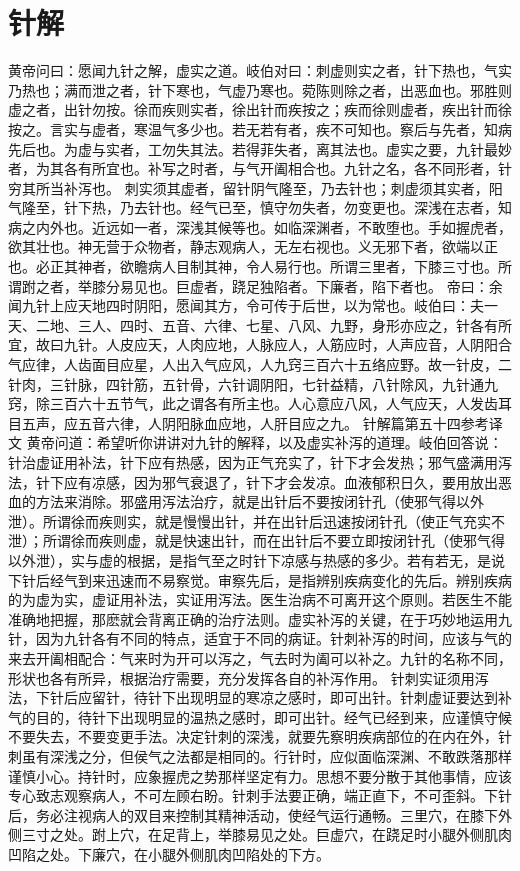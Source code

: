 \documentclass[a4paper,12pt,UTF8,twoside]{ctexbook}
\begin{document}
\chapter{针解}
黄帝问曰：愿闻九针之解，虚实之道。岐伯对曰：刺虚则实之者，针下热也，气实乃热也；满而泄之者，针下寒也，气虚乃寒也。菀陈则除之者，出恶血也。邪胜则虚之者，出针勿按。徐而疾则实者，徐出针而疾按之；疾而徐则虚者，疾出针而徐按之。言实与虚者，寒温气多少也。若无若有者，疾不可知也。察后与先者，知病先后也。为虚与实者，工勿失其法。若得菲失者，离其法也。虚实之要，九针最妙者，为其各有所宜也。补写之时者，与气开阖相合也。九针之名，各不同形者，针穷其所当补泻也。
刺实须其虚者，留针阴气隆至，乃去针也；刺虚须其实者，阳气隆至，针下热，乃去针也。经气已至，慎守勿失者，勿变更也。深浅在志者，知病之内外也。近远如一者，深浅其候等也。如临深渊者，不敢堕也。手如握虎者，欲其壮也。神无营于众物者，静志观病人，无左右视也。义无邪下者，欲端以正也。必正其神者，欲瞻病人目制其神，令人易行也。所谓三里者，下膝三寸也。所谓跗之者，举膝分易见也。巨虚者，跷足独陷者。下廉者，陷下者也。
帝曰：余闻九针上应天地四时阴阳，愿闻其方，令可传于后世，以为常也。岐伯曰：夫一天、二地、三人、四时、五音、六律、七星、八风、九野，身形亦应之，针各有所宜，故曰九针。人皮应天，人肉应地，人脉应人，人筋应时，人声应音，人阴阳合气应律，人齿面目应星，人出入气应风，人九窍三百六十五络应野。故一针皮，二针肉，三针脉，四针筋，五针骨，六针调阴阳，七针益精，八针除风，九针通九窍，除三百六十五节气，此之谓各有所主也。人心意应八风，人气应天，人发齿耳目五声，应五音六律，人阴阳脉血应地，人肝目应之九。
针解篇第五十四参考译文
黄帝问道：希望听你讲讲对九针的解释，以及虚实补泻的道理。岐伯回答说：针治虚证用补法，针下应有热感，因为正气充实了，针下才会发热；邪气盛满用泻法，针下应有凉感，因为邪气衰退了，针下才会发凉。血液郁积日久，要用放出恶血的方法来消除。邪盛用泻法治疗，就是出针后不要按闭针孔（使邪气得以外泄）。所谓徐而疾则实，就是慢慢出针，并在出针后迅速按闭针孔（使正气充实不泄）；所谓徐而疾则虚，就是快速出针，而在出针后不要立即按闭针孔（使邪气得以外泄），实与虚的根据，是指气至之时针下凉感与热感的多少。若有若无，是说下针后经气到来迅速而不易察觉。审察先后，是指辨别疾病变化的先后。辨别疾病的为虚为实，虚证用补法，实证用泻法。医生治病不可离开这个原则。若医生不能准确地把握，那麽就会背离正确的治疗法则。虚实补泻的关键，在于巧妙地运用九针，因为九针各有不同的特点，适宜于不同的病证。针刺补泻的时间，应该与气的来去开阖相配合：气来时为开可以泻之，气去时为阖可以补之。九针的名称不同，形状也各有所异，根据治疗需要，充分发挥各自的补泻作用。
针刺实证须用泻法，下针后应留针，待针下出现明显的寒凉之感时，即可出针。针刺虚证要达到补气的目的，待针下出现明显的温热之感时，即可出针。经气已经到来，应谨慎守候不要失去，不要变更手法。决定针刺的深浅，就要先察明疾病部位的在内在外，针刺虽有深浅之分，但侯气之法都是相同的。行针时，应似面临深渊、不敢跌落那样谨慎小心。持针时，应象握虎之势那样坚定有力。思想不要分散于其他事情，应该专心致志观察病人，不可左顾右盼。针刺手法要正确，端正直下，不可歪斜。下针后，务必注视病人的双目来控制其精神活动，使经气运行通畅。三里穴，在膝下外侧三寸之处。跗上穴，在足背上，举膝易见之处。巨虚穴，在跷足时小腿外侧肌肉凹陷之处。下廉穴，在小腿外侧肌肉凹陷处的下方。
\end{document}
